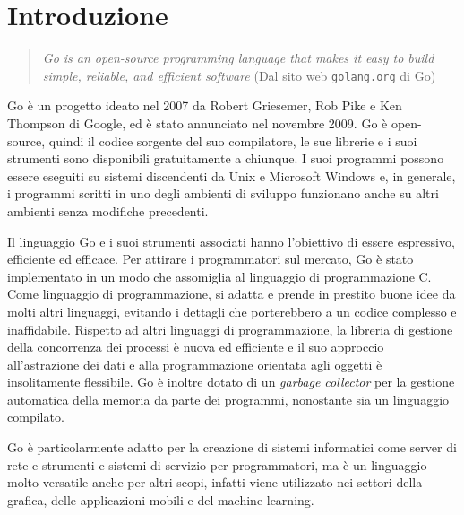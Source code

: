 \documentclass[../thesis.tex]{subfiles}
\begin{document}
    \newpage
    \section*{Introduzione}
    \begin{quotation}
        \begin{small}
            \textit{Go is an open-source programming language that makes it easy to build simple, reliable, and efficient software} (Dal sito web \verb"golang.org" di Go)
        \end{small}
    \end{quotation}

    Go è un progetto ideato nel 2007 da Robert Griesemer, Rob Pike e Ken Thompson di Google, ed è stato annunciato nel novembre 2009.
    Go è open-source, quindi il codice sorgente del suo compilatore, le sue librerie e i suoi strumenti sono disponibili gratuitamente a chiunque.
    I suoi programmi possono essere eseguiti su sistemi discendenti da Unix e Microsoft Windows e, in generale, i programmi scritti in uno degli ambienti di sviluppo funzionano anche su altri ambienti senza modifiche precedenti.
    \hfill \vspace{12pt}

    Il linguaggio Go e i suoi strumenti associati hanno l'obiettivo di essere espressivo, efficiente ed efficace.
    Per attirare i programmatori sul mercato, Go è stato implementato in un modo che assomiglia al linguaggio di programmazione C. Come linguaggio di programmazione, si adatta e prende in prestito buone idee da molti altri linguaggi, evitando i dettagli che porterebbero a un codice complesso e inaffidabile.
    Rispetto ad altri linguaggi di programmazione, la libreria di gestione della concorrenza dei processi è nuova ed efficiente e il suo approccio all'astrazione dei dati e alla programmazione orientata agli oggetti è insolitamente flessibile.
    Go è inoltre dotato di un \textit{garbage collector} per la gestione automatica della memoria da parte dei programmi, nonostante sia un linguaggio compilato.
    \hfill \vspace{12pt}

    Go è particolarmente adatto per la creazione di sistemi informatici come server di rete e strumenti e sistemi di servizio per programmatori, ma è un linguaggio molto versatile anche per altri scopi, infatti viene utilizzato nei settori della grafica, delle applicazioni mobili e del machine learning.
    
    
    \clearpage
\end{document}
